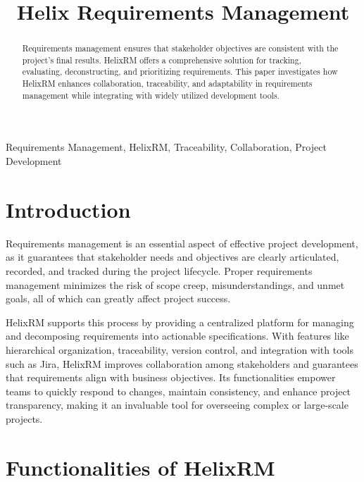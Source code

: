 \documentclass[conference]{IEEEtran}
\begin{document}
\title{Helix Requirements Management\\

}



\maketitle

\begin{abstract}
Requirements management ensures that stakeholder objectives are consistent with the project's final results.
HelixRM offers a comprehensive solution for tracking, evaluating, deconstructing, and prioritizing requirements.
This paper investigates how HelixRM enhances collaboration, traceability, and adaptability in requirements management while integrating with widely utilized development tools.
\end{abstract}

\begin{IEEEkeywords}
Requirements Management, HelixRM, Traceability, Collaboration, Project Development
\end{IEEEkeywords}

\section{Introduction}\label{sec:introduction}
Requirements management is an essential aspect of effective project development, as it guarantees that stakeholder needs and objectives are clearly articulated, recorded, and tracked during the project lifecycle.
Proper requirements management minimizes the risk of scope creep, misunderstandings, and unmet goals, all of which can greatly affect project success.

HelixRM supports this process by providing a centralized platform for managing and decomposing requirements into actionable specifications.
With features like hierarchical organization, traceability, version control, and integration with tools such as Jira, HelixRM improves collaboration among stakeholders and guarantees that requirements align with business objectives.
Its functionalities empower teams to quickly respond to changes, maintain consistency, and enhance project transparency, making it an invaluable tool for overseeing complex or large-scale projects.

\section{Functionalities of HelixRM}\label{sec:functionalities-of-helixrm}
\end{document}
